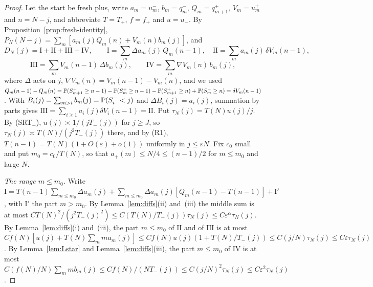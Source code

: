 \begin{proof}
Let the start be fresh plus, write $a_m=u^\minus_m$, $b_m=q^\minus_m$, $Q_m=q^\plus_{m+1}$, $V_m=u^\plus_m$
and $n=N-j$, and abbreviate $T=T_\plus$, $f=f_\plus$ and $u=u_\minus$. By
Proposition~\ref{prop:fresh-identity}, $P_N(N-j)=\sum_m[a_m(j)Q_m(n)+V_m(n)b_m(j)]$, and
\[
 D_N(j)=\mathrm I+\mathrm{II}+\mathrm{III}+\mathrm{IV},\qquad
 \mathrm I=\sum_m\Delta a_m(j)\,Q_m(n-1),\quad
 \mathrm{II}=\sum_ma_m(j)\,\delta V_m(n-1),
\]
\[
 \mathrm{III}=\sum_mV_m(n-1)\,\Delta b_m(j),\qquad
 \mathrm{IV}=\sum_m\nabla V_m(n)\,b_m(j),
\]
where $\Delta$ acts on $j$, $\nabla V_m(n)=V_m(n-1)-V_m(n)$, and we used
$Q_m(n-1)-Q_m(n)=\mathbb{P}(S^{+}_{m+1}\ge n-1)-\mathbb{P}(S^{+}_m\ge n-1)-\mathbb{P}(S^{+}_{m+1}\ge n)+\mathbb{P}(S^{+}_m\ge n)=\delta V_m(n-1)$.
With $B_i(j)=\sum_{m>i}b_m(j)=\mathbb{P}(S^{-}_i<j)$ and $\Delta B_i(j)=a_i(j)$, summation by parts gives
$\mathrm{III}=\sum_{i\ge1}a_i(j)\delta V_i(n-1)=\mathrm{II}$. Put $\tau_N(j)=T(N)u(j)/j$. By (SRT$_\minus$),
$u(j)\asymp1/(jT_\minus(j))$ for $j\ge J$, so $\tau_N(j)\asymp T(N)/(j^2T_\minus(j))$ there, and by (R1),
$T(n-1)=T(N)(1+O(\varepsilon)+o(1))$ uniformly in $j\le\varepsilon N$. Fix $c_0$ small and put
$m_0=c_0/T(N)$, so that $a_\plus(m)\le N/4\le(n-1)/2$ for $m\le m_0$ and large $N$.

\emph{The range $m\le m_0$.} Write $\mathrm I=T(n-1)\sum_{m\le m_0}\Delta a_m(j)+\sum_{m\le m_0}\Delta a_m(j)[Q_m(n-1)-T(n-1)]+\mathrm I'$,
with $\mathrm I'$ the part $m>m_0$. By Lemma~\ref{lem:diffs}(ii) and~(iii) the middle sum is at most
$CT(N)^2/(j^2T_\minus(j)^2)\le C(T(N)/T_\minus(j))\tau_N(j)\le C\varepsilon^\alpha\tau_N(j)$. By
Lemma~\ref{lem:diffs}(i) and~(iii), the part $m\le m_0$ of $\mathrm{II}$ and of $\mathrm{III}$ is at most
$Cf(N)[u(j)+T(N)\sum_mma_m(j)]\le Cf(N)u(j)(1+T(N)/T_\minus(j))\le C(j/N)\tau_N(j)\le C\varepsilon\tau_N(j)$.
By Lemma~\ref{lem:Lstar} and Lemma~\ref{lem:diffs}(iii), the part $m\le m_0$ of $\mathrm{IV}$ is at most
$C(f(N)/N)\sum_mmb_m(j)\le Cf(N)/(NT_\minus(j))\le C(j/N)^2\tau_N(j)\le C\varepsilon^2\tau_N(j)$.


\end{proof}
